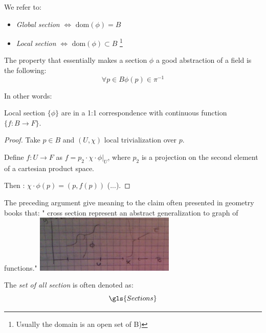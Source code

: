 \documentclass[a4paper,12pt]{scrartcl}    %
\begin{document}
\begin{notationfix}
We refer to:
\begin{itemize}
\item \emph{Global section} $\Leftrightarrow$ $\textrm{dom}(\phi) = B$
\item \emph{Local section} $\Leftrightarrow$ $\textrm{dom}(\phi) \subset B$ \footnote{Usually the domain is an open set of B)}
\end{itemize}
\end{notationfix}

\begin{observation}
The property that essentially makes a section $\phi$ a good abstraction of a field is the following:
\begin{displaymath}
\forall p \in B \phi(p) \in \pi^{-1}
\end{displaymath}
\end{observation}

In other words:
\begin{proposition}
Local section $\{\phi \}$ are in a 1:1 correspondence with continuous function $\{ f: B \rightarrow F \} $.
\end{proposition}
\begin{proof}


Take $p\in B$ and $(U,\chi)$ local trivialization over $p$.

Define $f: U \rightarrow F$ as $f= p_{2} \cdot \chi \cdot \phi \vert_{U}$, where $p_{2}$ is a projection on the second element of a cartesian product space.

Then : $\chi \cdot \phi (p) = ( p, f(p) )$ (...).

\end{proof}

\begin{observation}
The preceding argument give meaning to the claim often presented in geometry books that: " cross section represent an abstract generalization to graph of functions."
\includegraphics[width=0.5\textwidth]{TempPictures/SectionasGraph.jpg}
\end{observation}

\begin{notationfix}
The \emph{set of all section} is often denoted as:
$$\gls{Sections} $$
\end{notationfix}
\end{document}
